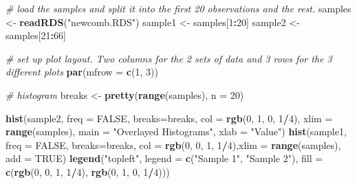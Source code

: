 \documentclass[
]{article}
\newenvironment{Shaded}{\begin{snugshade}}{\end{snugshade}}
\newcommand{\AttributeTok}[1]{\textcolor[rgb]{0.13,0.29,0.53}{#1}}
\newcommand{\CommentTok}[1]{\textcolor[rgb]{0.56,0.35,0.01}{\textit{#1}}}
\newcommand{\ConstantTok}[1]{\textcolor[rgb]{0.56,0.35,0.01}{#1}}
\newcommand{\DecValTok}[1]{\textcolor[rgb]{0.00,0.00,0.81}{#1}}
\newcommand{\FunctionTok}[1]{\textcolor[rgb]{0.13,0.29,0.53}{\textbf{#1}}}
\newcommand{\NormalTok}[1]{#1}
\newcommand{\OtherTok}[1]{\textcolor[rgb]{0.56,0.35,0.01}{#1}}
\newcommand{\SpecialCharTok}[1]{\textcolor[rgb]{0.81,0.36,0.00}{\textbf{#1}}}
\newcommand{\StringTok}[1]{\textcolor[rgb]{0.31,0.60,0.02}{#1}}
\begin{document}
\begin{Shaded}
\begin{Highlighting}[]
\CommentTok{\# load the samples and split it into the first 20 observations and the rest.}
\NormalTok{samples }\OtherTok{\textless{}{-}} \FunctionTok{readRDS}\NormalTok{(}\StringTok{"newcomb.RDS"}\NormalTok{)}
\NormalTok{sample1 }\OtherTok{\textless{}{-}}\NormalTok{ samples[}\DecValTok{1}\SpecialCharTok{:}\DecValTok{20}\NormalTok{]}
\NormalTok{sample2 }\OtherTok{\textless{}{-}}\NormalTok{ samples[}\DecValTok{21}\SpecialCharTok{:}\DecValTok{66}\NormalTok{]}

\CommentTok{\# set up plot layout. Two columns for the 2 sets of data and 3 rows for the 3 different plots}
\FunctionTok{par}\NormalTok{(}\AttributeTok{mfrow =} \FunctionTok{c}\NormalTok{(}\DecValTok{1}\NormalTok{, }\DecValTok{3}\NormalTok{))}

\CommentTok{\# histogram}
\NormalTok{breaks }\OtherTok{\textless{}{-}} \FunctionTok{pretty}\NormalTok{(}\FunctionTok{range}\NormalTok{(samples), }\AttributeTok{n =} \DecValTok{20}\NormalTok{)}

\FunctionTok{hist}\NormalTok{(sample2, }\AttributeTok{freq =} \ConstantTok{FALSE}\NormalTok{, }\AttributeTok{breaks=}\NormalTok{breaks, }\AttributeTok{col =} \FunctionTok{rgb}\NormalTok{(}\DecValTok{0}\NormalTok{, }\DecValTok{1}\NormalTok{, }\DecValTok{0}\NormalTok{, }\DecValTok{1}\SpecialCharTok{/}\DecValTok{4}\NormalTok{), }\AttributeTok{xlim =} \FunctionTok{range}\NormalTok{(samples),}
     \AttributeTok{main =} \StringTok{"Overlayed Histograms"}\NormalTok{, }\AttributeTok{xlab =} \StringTok{"Value"}\NormalTok{)}
\FunctionTok{hist}\NormalTok{(sample1, }\AttributeTok{freq =} \ConstantTok{FALSE}\NormalTok{, }\AttributeTok{breaks=}\NormalTok{breaks, }\AttributeTok{col =} \FunctionTok{rgb}\NormalTok{(}\DecValTok{0}\NormalTok{, }\DecValTok{0}\NormalTok{, }\DecValTok{1}\NormalTok{, }\DecValTok{1}\SpecialCharTok{/}\DecValTok{4}\NormalTok{),}\AttributeTok{xlim =} \FunctionTok{range}\NormalTok{(samples), }\AttributeTok{add =} \ConstantTok{TRUE}\NormalTok{)}
\FunctionTok{legend}\NormalTok{(}\StringTok{"topleft"}\NormalTok{, }\AttributeTok{legend =} \FunctionTok{c}\NormalTok{(}\StringTok{"Sample 1"}\NormalTok{, }\StringTok{"Sample 2"}\NormalTok{),}
       \AttributeTok{fill =} \FunctionTok{c}\NormalTok{(}\FunctionTok{rgb}\NormalTok{(}\DecValTok{0}\NormalTok{, }\DecValTok{0}\NormalTok{, }\DecValTok{1}\NormalTok{, }\DecValTok{1}\SpecialCharTok{/}\DecValTok{4}\NormalTok{), }\FunctionTok{rgb}\NormalTok{(}\DecValTok{0}\NormalTok{, }\DecValTok{1}\NormalTok{, }\DecValTok{0}\NormalTok{, }\DecValTok{1}\SpecialCharTok{/}\DecValTok{4}\NormalTok{)))}



\end{Highlighting}
\end{Shaded}
\end{document}
